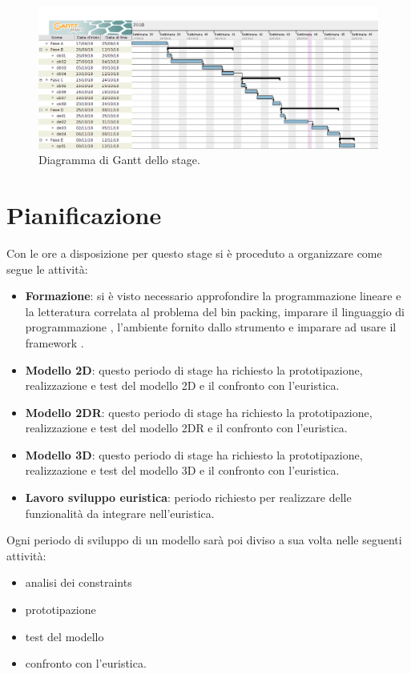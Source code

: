 \begin{figure}[H]
	\begin{center} \includegraphics[scale=0.25]{figures/stage}
		\caption[Diagramma d Gantt]{Diagramma di Gantt dello stage.}
		\label{fig:gantt}
	\end{center}
\end{figure}
\section{Pianificazione}
Con le ore a disposizione per questo stage si è proceduto a organizzare come segue le attività:
\begin{itemize}
	\item \textbf{Formazione}: si è visto necessario approfondire la programmazione lineare e la letteratura correlata al problema del bin packing, imparare il linguaggio di programmazione , l'ambiente fornito dallo strumento  e imparare ad usare il framework .
	\item \textbf{Modello 2D}: questo periodo di stage ha richiesto la prototipazione, realizzazione e test del modello 2D e il confronto con l'euristica.
	\item \textbf{Modello 2DR}: questo periodo di stage ha richiesto la prototipazione, realizzazione e test del modello 2DR e il confronto con l'euristica.
	\item \textbf{Modello 3D}: questo periodo di stage ha richiesto la prototipazione, realizzazione e test del modello 3D e il confronto con l'euristica.
	\item \textbf{Lavoro sviluppo euristica}: periodo richiesto per realizzare delle funzionalità da integrare nell'euristica.
\end{itemize}

Ogni periodo di sviluppo di un modello sarà poi diviso a sua volta nelle seguenti attività:
\begin{itemize}
	\item analisi dei constraints
	\item prototipazione 
	\item test del modello
	\item confronto con l'euristica.
\end{itemize}

